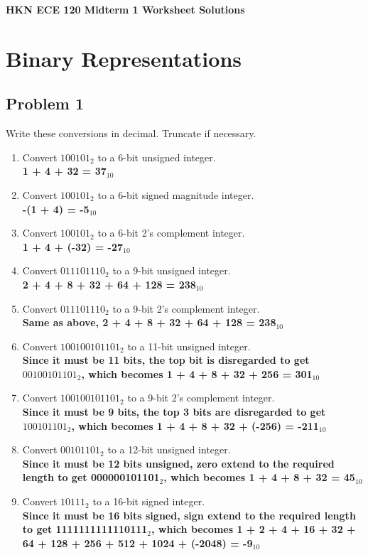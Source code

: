 \documentclass{article}
\begin{document}
\begin{center}
\textbf{
{\Large HKN ECE 120 Midterm 1 Worksheet Solutions}
}
\end{center} 
\noindent\makebox[\linewidth]{\rule{\linewidth}{0.2pt}}


\section*{Binary Representations}
\subsection*{Problem 1}
Write these conversions in decimal. Truncate if necessary.
\begin{enumerate}[label=\alph*.]
    \item Convert $100101_2$ to a 6-bit unsigned integer.\\
    \textbf{1 + 4 + 32 = 37$_{10}$}
    \item Convert $100101_2$ to a 6-bit signed magnitude integer.\\
    \textbf{-(1 + 4) = -5$_{10}$}
    \item Convert $100101_2$ to a 6-bit 2's complement integer.\\
    \textbf{1 + 4 + (-32) = -27$_{10}$}
    \item Convert $0 1110 1110_2$ to a 9-bit unsigned integer.\\
    \textbf{2 + 4 + 8 + 32 + 64 + 128 = 238$_{10}$}
    \item Convert $0 1110 1110_2$ to a 9-bit 2's complement integer.\\
    \textbf{Same as above, 2 + 4 + 8 + 32 + 64 + 128 = 238$_{10}$}
    \item Convert $1001 0010 1101_2$ to a 11-bit unsigned integer.\\
    \textbf{Since it must be 11 bits, the top bit is disregarded to get $001 0010 1101_2$, which becomes 1 + 4 + 8 + 32 + 256 = 301$_{10}$}
    \item Convert $1001 0010 1101_2$ to a 9-bit 2's complement integer.\\
    \textbf{Since it must be 9 bits, the top 3 bits are disregarded to get $1 0010 1101_2$, which becomes 1 + 4 + 8 + 32 + (-256) = -211$_{10}$}
    \item Convert $0010 1101_2$ to a 12-bit unsigned integer.\\
    \textbf{Since it must be 12 bits unsigned, zero extend to the required length to get 000000101101$_2$, which becomes 1 + 4 + 8 + 32 = 45$_{10}$}
    \item Convert $1 0111_2$ to a 16-bit signed integer.\\
    \textbf{Since it must be 16 bits signed, sign extend to the required length to get 1111111111110111$_2$, which becomes 1 + 2 + 4 + 16 + 32 + 64 + 128 + 256 + 512 + 1024 + (-2048) = -9$_{10}$}
\end{enumerate}
\end{document}
